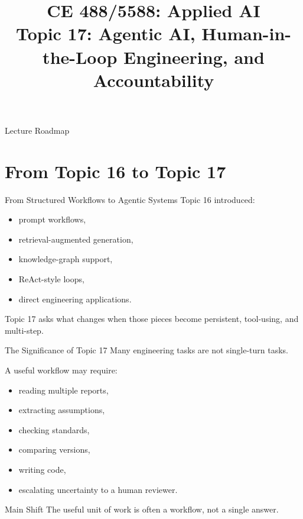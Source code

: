 \documentclass[12pt]{beamer}
\title[Topic 17: Agentic AI]{CE 488/5588: Applied AI\\Topic 17: Agentic AI, Human-in-the-Loop Engineering, and Accountability}
\author{}
\date{}
\begin{document}
\begin{frame}
  \titlepage
\end{frame}

\begin{frame}{Lecture Roadmap}
  \tableofcontents
\end{frame}

\section{From Topic 16 to Topic 17}

\begin{frame}{From Structured Workflows to Agentic Systems}
  Topic 16 introduced:
  \begin{itemize}
    \item prompt workflows,
    \item retrieval-augmented generation,
    \item knowledge-graph support,
    \item ReAct-style loops,
    \item direct engineering applications.
  \end{itemize}

  Topic 17 asks what changes when those pieces become persistent, tool-using, and multi-step.
\end{frame}

\begin{frame}{The Significance of Topic 17}
  Many engineering tasks are not single-turn tasks.

  A useful workflow may require:
  \begin{itemize}
    \item reading multiple reports,
    \item extracting assumptions,
    \item checking standards,
    \item comparing versions,
    \item writing code,
    \item escalating uncertainty to a human reviewer.
  \end{itemize}

  \begin{conceptbox}{Main Shift}
    The useful unit of work is often a workflow, not a single answer.
  \end{conceptbox}
\end{frame}
\end{document}
